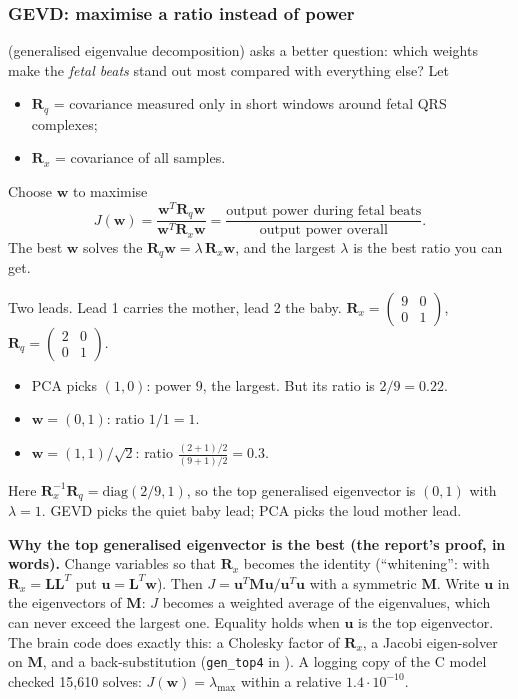 \documentclass[11pt]{article}
\begin{document}
\subsubsection{GEVD: maximise a ratio instead of power}
\label{sec:gevd}
 (generalised eigenvalue decomposition) asks a better question: which weights make the \emph{fetal beats} stand out most compared with everything else? Let
\begin{itemize}
  \item $\mathbf{R}_q$ = covariance measured only in short windows around fetal QRS complexes;
  \item $\mathbf{R}_x$ = covariance of all samples.
\end{itemize}
Choose $\mathbf{w}$ to maximise
\[
J(\mathbf{w}) = \frac{\mathbf{w}^T\mathbf{R}_q\mathbf{w}}{\mathbf{w}^T\mathbf{R}_x\mathbf{w}} = \frac{\text{output power during fetal beats}}{\text{output power overall}} .
\]
The best $\mathbf{w}$ solves the  $\mathbf{R}_q\mathbf{w} = \lambda\,\mathbf{R}_x\mathbf{w}$, and the largest $\lambda$ is the best ratio you can get.

\begin{simple}
Two leads. Lead 1 carries the mother, lead 2 the baby.
$\mathbf{R}_x = \begin{pmatrix}9&0\\0&1\end{pmatrix}$, $\mathbf{R}_q = \begin{pmatrix}2&0\\0&1\end{pmatrix}$.
\begin{itemize}
  \item PCA picks $(1,0)$: power 9, the largest. But its ratio is $2/9 = 0.22$.
  \item $\mathbf{w} = (0,1)$: ratio $1/1 = 1$.
  \item $\mathbf{w} = (1,1)/\sqrt2$: ratio $\frac{(2+1)/2}{(9+1)/2} = 0.3$.
\end{itemize}
Here $\mathbf{R}_x^{-1}\mathbf{R}_q = \text{diag}(2/9, 1)$, so the top generalised eigenvector is $(0,1)$ with $\lambda = 1$. GEVD picks the quiet baby lead; PCA picks the loud mother lead.
\end{simple}

\textbf{Why the top generalised eigenvector is the best (the report's proof, in words).} Change variables so that $\mathbf{R}_x$ becomes the identity (``whitening'': with $\mathbf{R}_x = \mathbf{L}\mathbf{L}^T$ put $\mathbf{u} = \mathbf{L}^T\mathbf{w}$). Then $J = \mathbf{u}^T\mathbf{M}\mathbf{u}/\mathbf{u}^T\mathbf{u}$ with a symmetric $\mathbf{M}$. Write $\mathbf{u}$ in the eigenvectors of $\mathbf{M}$: $J$ becomes a weighted average of the eigenvalues, which can never exceed the largest one. Equality holds when $\mathbf{u}$ is the top eigenvector. The brain code does exactly this: a Cholesky factor of $\mathbf{R}_x$, a Jacobi eigen-solver on $\mathbf{M}$, and a back-substitution (\texttt{gen\_top4} in ). A logging copy of the C model checked 15,610 solves: $J(\mathbf{w}) = \lambda_{\max}$ within a relative $1.4\cdot10^{-10}$.
\end{document}
